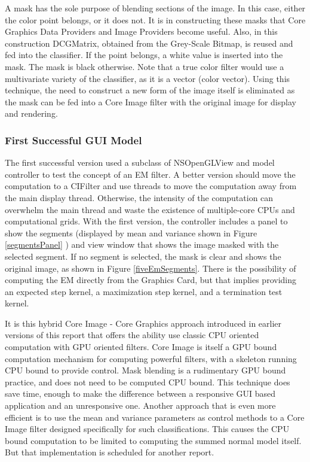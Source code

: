 \documentclass[11pt]{article}
\begin{document}
A mask has the sole purpose of blending sections of the image.   In this case, either the color point belongs, or it does not.     It is in constructing these masks  that Core Graphics Data Providers and Image Providers become useful.   Also, %
in this construction DCGMatrix, obtained from the Grey-Scale Bitmap, is reused and fed into the classifier.  If the point belongs, a white value is inserted into the mask.  The mask is black otherwise.   Note that a true color filter would use a multivariate variety of the classifier, as it is a vector (color vector).  Using this technique, the need to construct a new form of the image itself is eliminated as the mask can be fed into a Core Image filter with the original image for display and rendering.   

\subsubsection{First Successful GUI Model}
The first successful version used a subclass of NSOpenGLView and model controller to test the concept of an EM filter.  A better version should move the computation to a CIFilter and use threads to move the computation away from the main display thread.   Otherwise, the intensity of the computation can overwhelm the main thread and waste the existence of multiple-core CPUs and computational grids.   With the first version, the controller includes a panel to show the segments (displayed by mean and variance shown in Figure \ref{segmentsPanel} ) and view window that shows the image masked with the selected segment.  If no segment is selected, the mask is clear and shows the original image, as shown in Figure \ref{fiveEmSegments}.  
There is the possibility of computing the EM directly from the Graphics Card, but that implies providing an expected step kernel, a maximization step kernel, and a termination test kernel.

It is this hybrid Core Image - Core Graphics approach introduced in earlier versions of this report that offers the ability use classic CPU oriented computation with GPU oriented filters.  Core Image is itself a GPU bound computation mechanism for computing powerful filters, with a skeleton running CPU bound to provide control.  Mask blending is a rudimentary GPU bound practice, and does not need to be computed CPU bound.  This technique does save time, enough to make the difference between a responsive GUI based application and an unresponsive one.  Another approach that is even more efficient is to use the mean and variance parameters as control methods to a Core Image filter designed specifically for such classifications.  This causes the CPU bound computation to be limited to computing the summed normal model itself.  But that implementation is scheduled for another report. 
\end{document}
